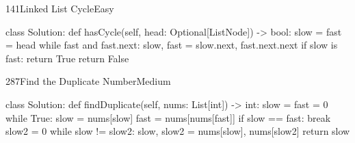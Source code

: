 \begin{problem}{141}{Linked List Cycle}{Easy}
\begin{code}
class Solution:
    def hasCycle(self, head: Optional[ListNode]) -> bool:
        slow = fast = head
        while fast and fast.next:
            slow, fast = slow.next, fast.next.next
            if slow is fast:
                return True
        return False
\end{code}
\end{problem}

\begin{problem}{287}{Find the Duplicate Number}{Medium}
\begin{code}
class Solution:
    def findDuplicate(self, nums: List[int]) -> int:
        slow = fast = 0
        while True:
            slow = nums[slow]
            fast = nums[nums[fast]]
            if slow == fast:
                break
        slow2 = 0
        while slow != slow2:
            slow, slow2 = nums[slow], nums[slow2]
        return slow
\end{code}
\end{problem}

